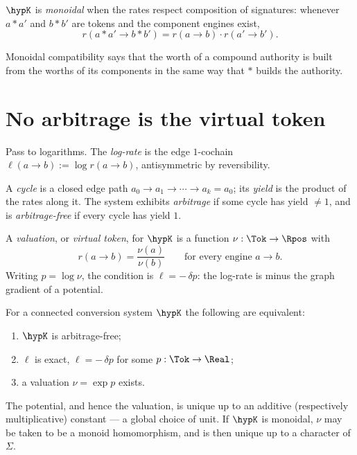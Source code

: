 \begin{definition}
\label{def:monoidal-conv}
$\hypK$ is \emph{monoidal} when the rates respect composition of
signatures: whenever $a \ast a'$ and $b \ast b'$ are tokens and the
component engines exist,
\[
  r(a \ast a' \to b \ast b') = r(a \to b) \cdot r(a' \to b') .
\]
\end{definition}

Monoidal compatibility says that the worth of a compound authority is
built from the worths of its components in the same way that $\ast$
builds the authority.

\section{No arbitrage is the virtual token}

Pass to logarithms.
The \emph{log-rate} is the edge $1$-cochain
$\ell(a \to b) := \log r(a \to b)$, antisymmetric by reversibility.

\begin{definition}[Arbitrage]
\label{def:arbitrage}
A \emph{cycle} is a closed edge path
$a_0 \to a_1 \to \cdots \to a_k = a_0$; its \emph{yield} is the product
of the rates along it.
The system exhibits \emph{arbitrage} if some cycle has yield $\neq 1$,
and is \emph{arbitrage-free} if every cycle has yield $1$.
\end{definition}

\begin{definition}
\label{def:virtual-token}
A \emph{valuation}, or \emph{virtual token}, for $\hypK$ is a function
$\nu : \Tok \to \Rpos$ with
\[
  r(a \to b) = \frac{\nu(a)}{\nu(b)} \qquad \text{for every engine } a \to b .
\]
Writing $p = \log \nu$, the condition is $\ell = -\,\delta p$: the
log-rate is minus the graph gradient of a potential.
\end{definition}

\begin{theorem}
\label{thm:vtok-ftap}
For a connected conversion system $\hypK$ the following are equivalent:
\begin{enumerate}[label=\textup{(\roman*)}]
  \item $\hypK$ is arbitrage-free;
  \item $\ell$ is exact, $\ell = -\,\delta p$ for some $p : \Tok \to \Real$;
  \item a valuation $\nu = \exp p$ exists.
\end{enumerate}
The potential, and hence the valuation, is unique up to an additive
(respectively multiplicative) constant --- a global choice of unit.
If $\hypK$ is monoidal, $\nu$ may be taken to be a monoid homomorphism,
and is then unique up to a character of $\Sigma$.
\end{theorem}

